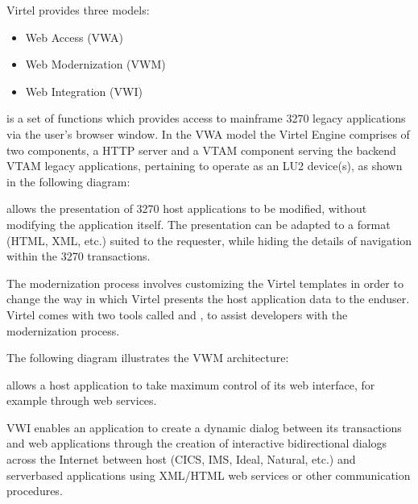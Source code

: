 \documentclass[letterpaper,10pt,english]{sphinxmanual}
\begin{document}
Virtel provides three models:
\begin{itemize}
\item {} 
Web Access (VWA)

\item {} 
Web Modernization (VWM)

\item {} 
Web Integration (VWI)

\end{itemize}

\newpage

 is a set of functions which provides access to mainframe 3270 legacy applications via the user’s browser window. In the VWA model the Virtel Engine comprises of two components, a HTTP server and a VTAM component serving the back\sphinxhyphen{}end VTAM legacy applications, pertaining to operate as an LU2 device(s), as shown in the following diagram:


\newpage

 allows the presentation of 3270 host applications to be modified, without modifying the application itself. The presentation can be adapted to a format (HTML, XML, etc.) suited to the requester, while hiding the details of navigation within the 3270 transactions.

The modernization process involves customizing the Virtel templates in order to change the way in which Virtel presents the host application data to the end\sphinxhyphen{}user. Virtel comes with two tools called  and , to assist developers with the modernization process.

The following diagram illustrates the VWM architecture:


\newpage

 allows a host application to take maximum control of its web interface, for example through web services.

VWI enables an application to create a dynamic dialog between its transactions and web applications through the creation of interactive bidirectional dialogs across the Internet between host (CICS, IMS, Ideal, Natural, etc.) and server\sphinxhyphen{}based applications using XML/HTML web services or other communication procedures.
\end{document}
